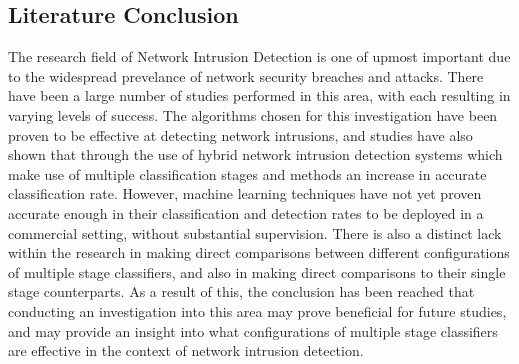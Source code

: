 	\subsection{Literature Conclusion}
	The research field of Network Intrusion Detection is one of upmost important due to the widespread prevelance of network security breaches and attacks. There have been a large number of studies performed in this area, with each resulting in varying levels of success. The algorithms chosen for this investigation have been proven to be effective at detecting network intrusions, and studies have also shown that through the use of hybrid network intrusion detection systems which make use of multiple classification stages and methods an increase in accurate classification rate. However, machine learning techniques have not yet proven accurate enough in their classification and detection rates to be deployed in a commercial setting, without substantial supervision. There is also a distinct lack within the research in making direct comparisons between different configurations of multiple stage classifiers, and also in making direct comparisons to their single stage counterparts. As a result of this, the conclusion has been reached that conducting an investigation into this area may prove beneficial for future studies, and may provide an insight into what configurations of multiple stage classifiers are effective in the context of network intrusion detection.

